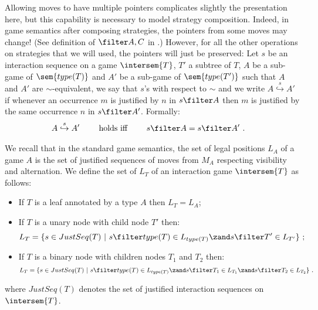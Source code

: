 Allowing moves to have multiple pointers complicates slightly the
presentation here, but this capability is necessary to model
strategy composition. Indeed, in game semantics after composing
strategies, the pointers from some moves may change! (See definition
of $\filter A,C$ in \cite{abramsky:game-semantics-tutorial}.)
However, for all the other operations on strategies that we will
used, the pointers will just be preserved:
Let $s$ be an  interaction sequence on a game
$\intersem{T}$, $T'$ a subtree of $T$, $A$ be a sub-game of
$\sem{type(T)}$ and $A'$ be a sub-game of $\sem{type(T')}$ such that $A$ and $A'$ are $\sim$-equivalent,
we say that $s$'s 
with respect to $\sim$ and we write $A\stackrel{s}\hookrightarrow A'$ if
whenever an occurrence $m$ is justified by $n$ in $s\filter A$ then $m$ is justified by the same occurrence $n$ in $s \filter A'$. Formally:
\begin{align*}
 A\stackrel{s}\hookrightarrow A' \qquad \mbox{ holds iff } \qquad  &
s\filter A = s\filter A' \ .
\end{align*}

\begin{definition} We recall
that in the standard game semantics, the set of legal positions
$L_A$ of a game $A$ is the set of justified sequences of moves from
$M_A$ respecting visibility and alternation. We define the set of
 $L_T$ of an interaction game $\intersem{T}$ as
follows:
    \begin{itemize}
    \item If $T$ is a leaf annotated by a type $A$ then $L_T =
    L_A$;
    \item If $T$ is a unary node with child node $T'$ then:
    $$L_T = \{ s \in JustSeq(T) \ | \ s \filter type(T) \in L_{type(T)} \zand  s \filter T' \in L_{T'} \} \ ;$$
    \item If $T$ is a binary node with children nodes $T_1$ and $T_2$ then:
    $$L_T = \{ s \in JustSeq(T) \ | \ s \filter type(T) \in L_{type(T)} \zand  s \filter T_1 \in L_{T_1}
    \zand  s \filter T_2 \in L_{T_2} \} \ .$$
    \end{itemize}
    where $JustSeq(T)$ denotes the set of justified interaction sequences on
    $\intersem{T}$.
\end{definition}

